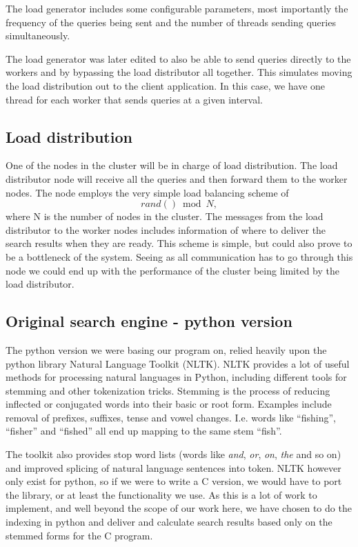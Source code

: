 The load generator includes some configurable parameters, most importantly the frequency of the queries being sent and the number of threads sending queries simultaneously.

The load generator was later edited to also be able to send queries directly to the workers and by bypassing the load distributor all together. This simulates moving the load distribution out to the client application. In this case, we have one thread for each worker that sends queries at a given interval.

\subsection{Load distribution}
One of the nodes in the cluster will be in charge of load distribution. The load distributor node will receive all the queries and then forward them to the worker nodes.
The node employs the very simple load balancing scheme of $$rand() \bmod N,$$ where N is the number of nodes in the cluster.
The messages from the load distributor to the worker nodes includes information of where to deliver the search results when they are ready.
This scheme is simple, but could also prove to be a bottleneck of the system. Seeing as all communication has to go through this node we could end up with the performance of the cluster being limited by the load distributor.

\subsection{Original search engine - python version}
The python version we were basing our program on, relied heavily upon the python library Natural Language Toolkit\cite{nltk} (NLTK).
NLTK provides a lot of useful methods for processing natural languages in Python, including different tools for stemming and other tokenization tricks.
Stemming is the process of reducing inflected or conjugated words into their basic or root form. Examples include removal of prefixes, suffixes, tense and vowel changes. I.e. words like ``fishing'', ``fisher'' and ``fished'' all end up mapping to the same stem ``fish''.

The toolkit also provides stop word lists (words like {\em and}, {\em or}, {\em on}, {\em the} and so on) and improved splicing of natural language sentences into token.
NLTK however only exist for python, so if we were to write a C version, we would have to port the library, or at least the functionality we use.
As this is a lot of work to implement, and well beyond the scope of our work here, we have chosen to do the indexing in python and deliver and calculate search results based only on the stemmed forms for the C program.

